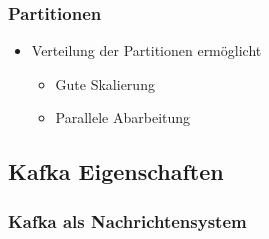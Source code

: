 \begin{frame}
\frametitle{Partitionen}
\begin{itemize}
	\item Verteilung der Partitionen ermöglicht
	\begin{itemize}
		\item Gute Skalierung
		\item Parallele Abarbeitung
	\end{itemize}
\end{itemize}
\end{frame}

\subsection{Kafka Eigenschaften}
\begin{frame}
\frametitle{Kafka als Nachrichtensystem}


\end{frame}
